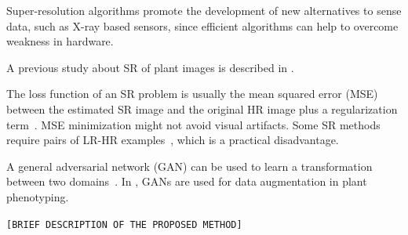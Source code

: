 \documentclass[10pt,twocolumn,letterpaper]{article}
\begin{document}
Super-resolution algorithms promote the development of new alternatives to sense data, such as X-ray based sensors, since efficient algorithms can help to overcome weakness in hardware.

A previous study about SR of plant images is described in \cite{Yamamoto2017}.

The loss function of an SR problem is usually the mean squared error (MSE) between the estimated SR image and the original HR image plus a regularization term~\cite{Ledig2017}. MSE minimization might not avoid visual artifacts. Some SR methods require pairs of LR-HR examples~\cite{Zeyde2012}, which is a practical disadvantage. 

A general adversarial network (GAN) can be used to learn a transformation between two domains~\cite{Hong2018}. In \cite{Giuffrida2017}, GANs are used for data augmentation in plant phenotyping.

\texttt{[BRIEF DESCRIPTION OF THE PROPOSED METHOD]}





\end{document}
